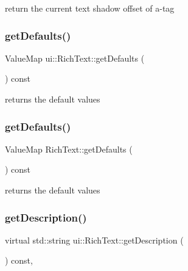 return the current text shadow offset of a-\/tag \mbox{\label{classui_1_1RichText_ac5ae824e98115ea1e26ac5dde056e448}} 
\subsubsection{\texorpdfstring{get\+Defaults()}{getDefaults()}\hspace{0.1cm}{\footnotesize\ttfamily [1/2]}}
{\footnotesize\ttfamily Value\+Map ui\+::\+Rich\+Text\+::get\+Defaults (\begin{DoxyParamCaption}{ }\end{DoxyParamCaption}) const}

returns the default values \mbox{\label{classui_1_1RichText_a63f5715a0904d8799910a300854cc2f6}} 
\subsubsection{\texorpdfstring{get\+Defaults()}{getDefaults()}\hspace{0.1cm}{\footnotesize\ttfamily [2/2]}}
{\footnotesize\ttfamily Value\+Map Rich\+Text\+::get\+Defaults (\begin{DoxyParamCaption}{ }\end{DoxyParamCaption}) const}

returns the default values \mbox{\label{classui_1_1RichText_aeae6c6fd1f11e9342ada2ef87dbf8681}} 
\subsubsection{\texorpdfstring{get\+Description()}{getDescription()}\hspace{0.1cm}{\footnotesize\ttfamily [1/2]}}
{\footnotesize\ttfamily virtual std\+::string ui\+::\+Rich\+Text\+::get\+Description (\begin{DoxyParamCaption}{ }\end{DoxyParamCaption}) const\hspace{0.3cm}{\ttfamily [override]}, {\ttfamily [virtual]}}

